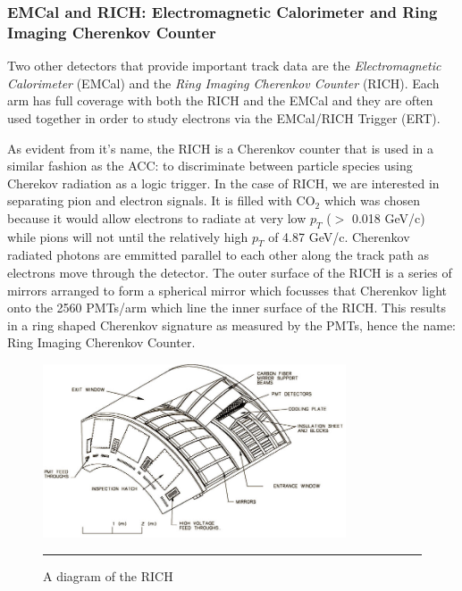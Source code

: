 \subsubsection{EMCal and RICH: Electromagnetic Calorimeter and Ring Imaging Cherenkov Counter}
Two other detectors that provide important track data are the \textit{Electromagnetic Calorimeter} (EMCal) and the \textit{Ring Imaging Cherenkov Counter} (RICH). Each arm has full coverage with both the RICH and the EMCal and they are often used together in order to study electrons via the EMCal/RICH Trigger (ERT).

As evident from it's name, the RICH is a Cherenkov counter that is used in a similar fashion as the ACC: to discriminate between particle species using Cherekov radiation as a logic trigger. In the case of RICH, we are interested in separating pion and electron signals. It is filled with CO$_2$ which was chosen because it would allow electrons to radiate at very low $p_T$ ($>$ 0.018 GeV/c) while pions will not until the relatively high $p_T$ of 4.87 GeV/c. Cherenkov radiated photons are emmitted parallel to each other along the track path as electrons move through the detector. The outer surface of the RICH is a series of mirrors arranged to form a spherical mirror which focusses that Cherenkov light onto the 2560 PMTs/arm which line the inner surface of the RICH. This results in a ring shaped Cherenkov signature as measured by the PMTs, hence the name: Ring Imaging Cherenkov Counter. 

\begin{figure}[h!]
  \centering
    \includegraphics[width=0.8\textwidth]{Figures/RICHdiagram.jpg}
    \rule{35em}{0.5pt}
  \caption[A diagram of the RICH]{A diagram of the RICH}
  \label{fig:RICHdiagram}
\end{figure}

